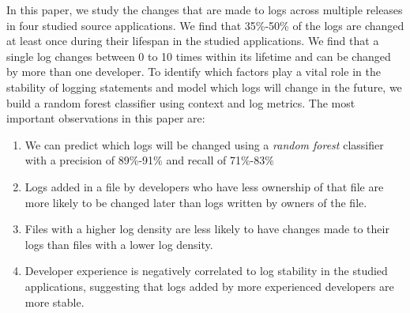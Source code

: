 In this paper, we study the changes that are made to logs across multiple releases in four studied source applications. We find that 35\%-50\% of the logs are changed at least once during their lifespan in the studied applications. We find that a single log changes between 0 to 10 times within its lifetime and can be changed by more than one developer. To identify which factors play a vital role in the stability of logging statements and model which logs will change in the future, we build a random forest classifier using context and log metrics. The most important observations in this paper are:
\begin{enumerate}
	\item  We can predict which logs will be changed using a \emph{random forest} classifier with a precision of 89\%-91\% and recall of 71\%-83\%
	\item Logs added in a file by developers who have less ownership of that file are more likely to be changed later than logs written by owners of the file. 
	\item Files with a higher log density are less likely to have changes made to their logs than files with a lower log density.
	\item Developer experience is negatively correlated to log stability in the studied applications, suggesting that logs added by more experienced developers are more stable. 

\end{enumerate}





%


